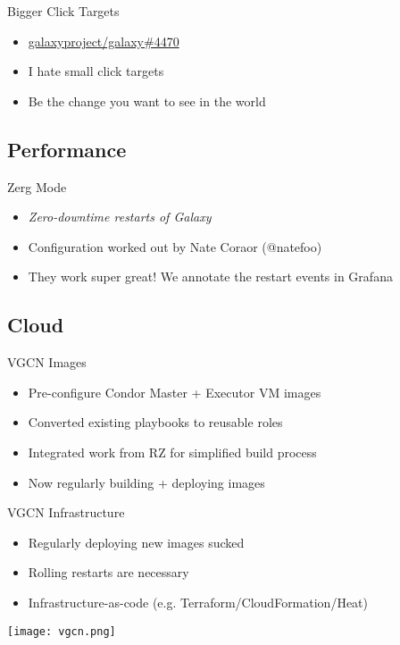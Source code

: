 \documentclass[12pt]{ufrslides}
\newcommand{\ghpr}[3]{\href{https://github.com/#1/#2/pull/#3}{#1/#2\##3}}
\begin{document}
	\begin{frame}{Bigger Click Targets}
		\begin{itemize}
			\item \ghpr{galaxyproject}{galaxy}{4470}
			\item I hate small click targets
			\item Be the change you want to see in the world
		\end{itemize}
	\end{frame}

\subsection{Performance}
	\begin{frame}{Zerg Mode}
		\begin{itemize}
			\item \emph{Zero-downtime restarts of Galaxy}
			\item Configuration worked out by Nate Coraor (@natefoo)
			\item They work super great! We annotate the restart events in Grafana
		\end{itemize}
	\end{frame}

\subsection{Cloud}
	\begin{frame}{VGCN Images}
		\begin{itemize}
			\item Pre-configure Condor Master + Executor VM images
			\item Converted existing playbooks to reusable roles
			\item Integrated work from RZ for simplified build process
			\item Now regularly building + deploying images
		\end{itemize}
	\end{frame}

	\begin{frame}{VGCN Infrastructure}
		\begin{itemize}
			\item Regularly deploying new images sucked
			\item Rolling restarts are necessary
			\item Infrastructure-as-code (e.g. Terraform/CloudFormation/Heat)
		\end{itemize}
		\texttt{[image: vgcn.png]}
	\end{frame}
\end{document}

